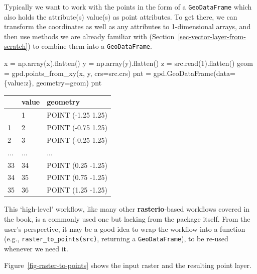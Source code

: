 \documentclass[
  letterpaper,
]{krantz}
\newenvironment{Shaded}{\begin{snugshade}}{\end{snugshade}}
\newcommand{\DecValTok}[1]{\textcolor[rgb]{0.68,0.00,0.00}{#1}}
\newcommand{\NormalTok}[1]{\textcolor[rgb]{0.00,0.23,0.31}{#1}}
\newcommand{\OperatorTok}[1]{\textcolor[rgb]{0.37,0.37,0.37}{#1}}
\newcommand{\StringTok}[1]{\textcolor[rgb]{0.13,0.47,0.30}{#1}}
\begin{document}
Typically we want to work with the points in the form of a
\texttt{GeoDataFrame} which also holds the attribute(s) value(s) as
point attributes. To get there, we can transform the coordinates as well
as any attributes to 1-dimensional arrays, and then use methods we are
already familiar with (Section~\ref{sec-vector-layer-from-scratch}) to
combine them into a \texttt{GeoDataFrame}.

\begin{Shaded}
\begin{Highlighting}[]
\NormalTok{x }\OperatorTok{=}\NormalTok{ np.array(x).flatten()}
\NormalTok{y }\OperatorTok{=}\NormalTok{ np.array(y).flatten()}
\NormalTok{z }\OperatorTok{=}\NormalTok{ src.read(}\DecValTok{1}\NormalTok{).flatten()}
\NormalTok{geom }\OperatorTok{=}\NormalTok{ gpd.points\_from\_xy(x, y, crs}\OperatorTok{=}\NormalTok{src.crs)}
\NormalTok{pnt }\OperatorTok{=}\NormalTok{ gpd.GeoDataFrame(data}\OperatorTok{=}\NormalTok{\{}\StringTok{\textquotesingle{}value\textquotesingle{}}\NormalTok{:z\}, geometry}\OperatorTok{=}\NormalTok{geom)}
\NormalTok{pnt}
\end{Highlighting}
\end{Shaded}

\begin{longtable}[]{@{}lll@{}}
\toprule\noalign{}
& value & geometry \\
\midrule\noalign{}
\endhead
\bottomrule\noalign{}
\endlastfoot
0 & 1 & POINT (-1.25 1.25) \\
1 & 2 & POINT (-0.75 1.25) \\
2 & 3 & POINT (-0.25 1.25) \\
... & ... & ... \\
33 & 34 & POINT (0.25 -1.25) \\
34 & 35 & POINT (0.75 -1.25) \\
35 & 36 & POINT (1.25 -1.25) \\
\end{longtable}

This `high-level' workflow, like many other \textbf{rasterio}-based
workflows covered in the book, is a commonly used one but lacking from
the package itself. From the user's perspective, it may be a good idea
to wrap the workflow into a function (e.g.,
\texttt{raster\_to\_points(src)}, returning a \texttt{GeoDataFrame}), to
be re-used whenever we need it.

Figure~\ref{fig-raster-to-points} shows the input raster and the
resulting point layer.
\end{document}
